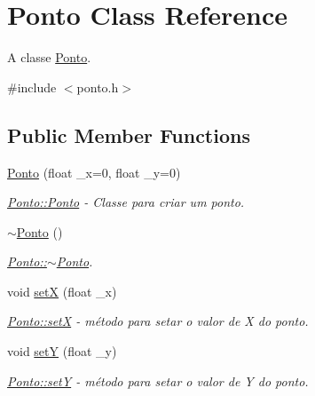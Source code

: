 \hypertarget{classPonto}{}\section{Ponto Class Reference}
\label{classPonto}


A classe \hyperlink{classPonto}{Ponto}.  




{\ttfamily \#include $<$ponto.\+h$>$}

\subsection*{Public Member Functions}
\begin{DoxyCompactItemize}
\item 
\hyperlink{classPonto_a5a157b4f3dc28842de40f505666f8899}{Ponto} (float \+\_\+x=0, float \+\_\+y=0)
\begin{DoxyCompactList}\small\item\em \hyperlink{classPonto_a5a157b4f3dc28842de40f505666f8899}{Ponto\+::\+Ponto} -\/ Classe para criar um ponto. \end{DoxyCompactList}\item 
\mbox{\label{classPonto_a3b0e3df470cda29d6bf52e6c11a1e8a6}} 
\hyperlink{classPonto_a3b0e3df470cda29d6bf52e6c11a1e8a6}{$\sim$\+Ponto} ()
\begin{DoxyCompactList}\small\item\em \hyperlink{classPonto_a3b0e3df470cda29d6bf52e6c11a1e8a6}{Ponto\+::$\sim$\+Ponto}. \end{DoxyCompactList}\item 
void \hyperlink{classPonto_a22129ad4dbf8019c479021d70a9f6774}{setX} (float \+\_\+x)
\begin{DoxyCompactList}\small\item\em \hyperlink{classPonto_a22129ad4dbf8019c479021d70a9f6774}{Ponto\+::setX} -\/ método para setar o valor de X do ponto. \end{DoxyCompactList}\item 
void \hyperlink{classPonto_a2d9e5b9fade9d3f3f21122a2dc2f5e11}{setY} (float \+\_\+y)
\begin{DoxyCompactList}\small\item\em \hyperlink{classPonto_a2d9e5b9fade9d3f3f21122a2dc2f5e11}{Ponto\+::setY} -\/ método para setar o valor de Y do ponto. \end{DoxyCompactList}\item 

\end{DoxyCompactItemize}
